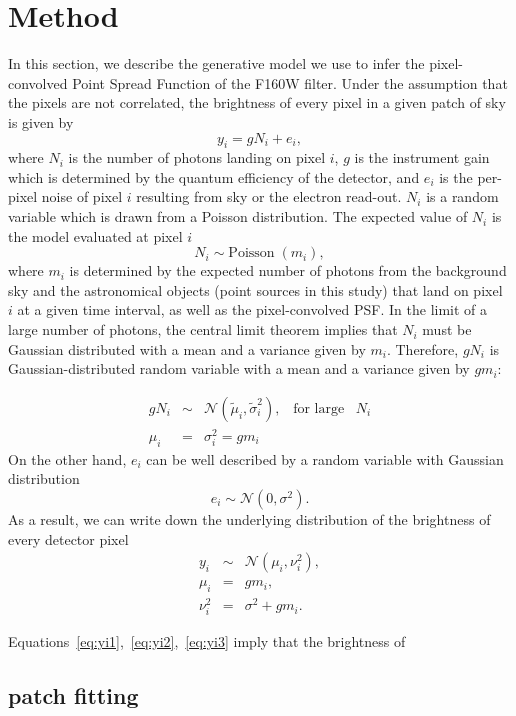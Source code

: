 \documentclass[onecolumn]{aastex61}
\newcommand{\beq}{\begin{equation}}
\newcommand{\eeq}{\end{equation}}
\begin{document}
\section{Method}\label{sec:hstmethod}
In this section, we describe the generative model we use to infer the 
pixel-convolved Point Spread Function of the F160W filter. 
Under the assumption that the pixels are not correlated, the brightness of 
every pixel in a given patch of sky is given by 
\beq
y_i = g N_i + e_i,
\eeq
where $N_i$ is the number of photons landing on pixel $i$, $g$ is the instrument gain which is determined by the quantum efficiency of the detector, and $e_i$ is the per-pixel noise of pixel $i$ resulting from sky or the electron read-out. 
$N_i$ is a random variable which is drawn from a Poisson distribution. The expected value of $N_i$ is the model evaluated at pixel $i$
\beq
N_i \sim \text{Poisson} \; (m_i),
\eeq
where $m_i$ is determined by the expected number of photons from the background sky and the astronomical objects (point sources in this study) that land on pixel $i$ at a given time interval, as well as the pixel-convolved PSF. 
In the limit of a large number of photons, the central limit theorem implies that 
$N_i$ must be Gaussian distributed with a mean and a variance given by $m_i$. 
Therefore, $gN_i$ is Gaussian-distributed random variable with a mean and a variance given by $gm_i$:

\begin{eqnarray}
gN_i &\sim& \mathcal{N}(\tilde{\mu}_i , \tilde{\sigma}_i^2), \;\;\; \text{for large}\;\;\; N_i\\
\mu_i &=& \sigma_i^2 = gm_i
\end{eqnarray}
On the other hand, $e_i$ can be well described by a random variable with Gaussian distribution 
\beq
e_i \sim \mathcal{N}(0 , \sigma^2).
\eeq
As a result, we can write down the underlying distribution of 
the brightness of every detector pixel
\begin{eqnarray}
y_i &\sim& \mathcal{N}(\mu_i , \nu_i^{2}), \label{eq:yi1} \\
\mu_i &=& gm_i, \label{eq:yi2} \\
\nu_i^{2} &=& \sigma^{2} + gm_i. \label{eq:yi3} 
\end{eqnarray}

Equations~\ref{eq:yi1},~\ref{eq:yi2},~\ref{eq:yi3} imply that the brightness of 

\subsection{patch fitting}
\end{document}
